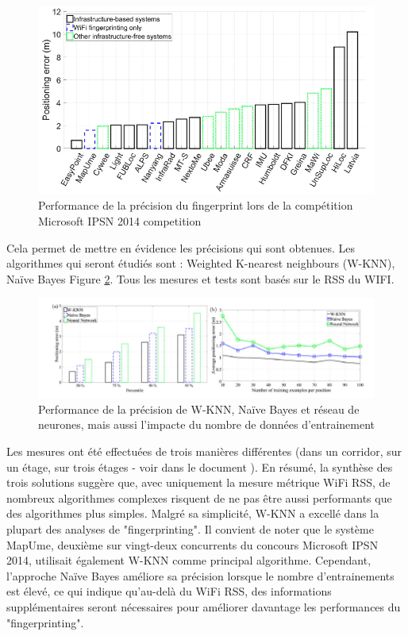 \begin{figure}[htp]
 \begin{center}
  \includegraphics[scale=0.6]{figures/Competition.png}
  \caption{Performance de la précision du fingerprint lors de la compétition Microsoft IPSN 2014 competition \cite{CP_RSS}}
  \label{fig:Competition} %
 \end{center}
\end{figure}

Cela permet de mettre en évidence les précisions qui sont obtenues. Les algorithmes qui seront étudiés sont : Weighted K-nearest neighbours (W-KNN), Naïve Bayes Figure \ref{fig:PerfAccu}. Tous les mesures et tests sont basés sur le RSS du WIFI. 

\begin{figure}[htp]
 \begin{center}
  \includegraphics[scale=1]{figures/PerfAccu.png}
  \caption{Performance de la précision de W-KNN, Naïve Bayes et réseau de neurones, mais aussi l'impacte du nombre de données d'entrainement\cite{CP_RSS}}
  \label{fig:PerfAccu} %
 \end{center}
\end{figure}

Les mesures ont été effectuées de trois manières différentes (dans un corridor, sur un étage, sur trois étages - voir dans le document  \cite{CP_RSS}). En résumé, la synthèse des trois solutions suggère que, avec uniquement la mesure métrique WiFi RSS, de nombreux algorithmes complexes risquent de ne pas être aussi performants que des algorithmes plus simples. Malgré sa simplicité, W-KNN a excellé dans la plupart des analyses de "fingerprinting". Il convient de noter que le système MapUme, deuxième sur vingt-deux concurrents du concours Microsoft IPSN 2014, utilisait également W-KNN comme principal algorithme. Cependant, l'approche Naïve Bayes améliore sa précision lorsque le nombre d'entrainements est élevé, ce qui indique qu'au-delà du WiFi RSS, des informations supplémentaires seront nécessaires pour améliorer davantage les performances du "fingerprinting".

